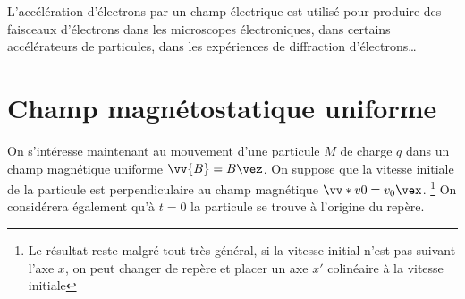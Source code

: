 \documentclass{cours}
\begin{document}
L'accélération d'électrons par un champ électrique est utilisé pour produire des faisceaux d'électrons dans les microscopes électroniques, dans certains accélérateurs de particules, dans les expériences de diffraction d'électrons\ldots

\section{Champ magnétostatique uniforme}%
\label{sec:mouvement_dans_un_champ_magetostatique_uniforme}
On s'intéresse maintenant au mouvement d'une particule $M$ de charge $q$ dans un champ magnétique uniforme $\vv{B} = B\vez$. On suppose que la vitesse initiale de la particule est perpendiculaire au champ magnétique $\vv*{v}{0} = v_0 \vex$. \footnote{Le résultat reste malgré tout très général, si la vitesse initial n'est pas suivant l'axe $x$, on peut changer de repère et placer un axe $x'$ colinéaire à la vitesse initiale} On considérera également qu'à $t=0$ la particule se trouve à l'origine du repère. 

\begin{center}
\end{center}
\end{document}
